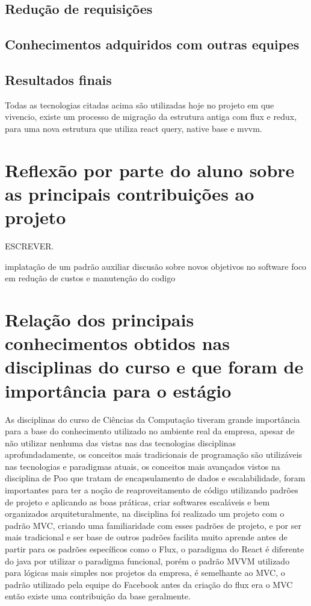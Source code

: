 \documentclass{ufersa}
\begin{document}
\subsection{Redução de requisições}
\subsection{Conhecimentos adquiridos com outras equipes}
\subsection{Resultados finais}

Todas as tecnologias citadas acima são utilizadas hoje no projeto em que vivencio, existe um processo de migração da estrutura antiga com flux e redux, para uma nova estrutura que utiliza react query, native base e mvvm.


\section{Reflexão por parte do aluno sobre as principais contribuições ao projeto}
ESCREVER.

implatação de um padrão auxiliar
discusão sobre novos objetivos no software
foco em redução de custos e manutenção do codigo

\section{Relação dos principais conhecimentos obtidos nas disciplinas do curso e que foram de importância para o estágio}
As disciplinas do curso de Ciências da Computação tiveram grande importância para a base do conhecimento utilizado no ambiente real da empresa, apesar de não utilizar nenhuma das vistas nas das tecnologias disciplinas aprofundadamente, os conceitos mais tradicionais de programação são utilizáveis nas tecnologias e paradigmas atuais,  os conceitos mais avançados vistos na disciplina de Poo que tratam de encapsulamento de dados e escalabilidade, foram importantes para ter a noção de reaproveitamento de código utilizando padrões de projeto e aplicando as boas práticas,  criar softwares escaláveis e bem organizados arquiteturalmente, na disciplina foi realizado um projeto com o padrão MVC, criando  uma familiaridade com esses padrões de projeto, e por ser mais tradicional e ser base de outros padrões facilita muito aprende antes de partir para os padrões específicos como o Flux, o paradigma do React é diferente do java por utilizar o paradigma funcional, porém o padrão MVVM utilizado para lógicas mais simples nos projetos da empresa, é semelhante ao MVC, o padrão utilizado pela equipe do Facebook antes da criação do flux era o MVC então existe uma contribuição da base geralmente. 
\end{document}
